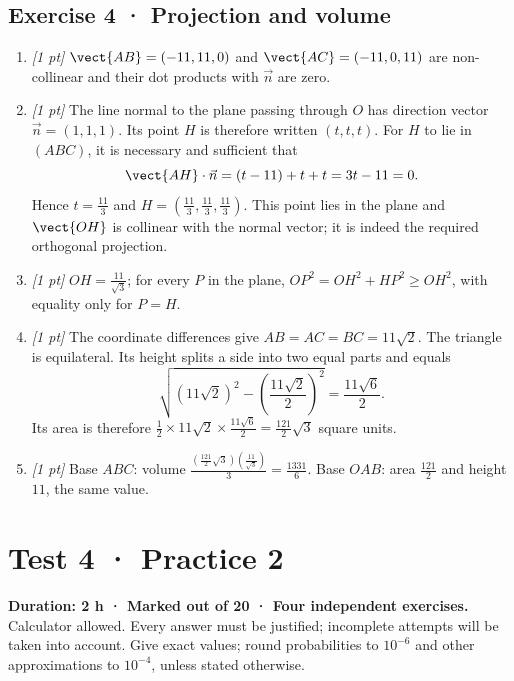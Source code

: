 \subsection*{Exercise 4 · Projection and volume}\begin{enumerate}

\item \textit{[1 pt]} $\vect{AB}=(-11,11,0)$ and $\vect{AC}=(-11,0,11)$ are non-collinear and their dot products with $\vec n$ are zero.

\item \textit{[1 pt]} The line normal to the plane passing through $O$ has direction vector $\vec n=(1,1,1)$. Its point $H$ is therefore written $(t,t,t)$. For $H$ to lie in $(ABC)$, it is necessary and sufficient that
\[\vect{AH}\cdot\vec n=(t-11)+t+t=3t-11=0.\]
Hence $t=\frac{11}{3}$ and $H=(\frac{11}{3},\frac{11}{3},\frac{11}{3})$. This point lies in the plane and $\vect{OH}$ is collinear with the normal vector; it is indeed the required orthogonal projection.

\item \textit{[1 pt]} $OH=\frac{11}{\sqrt{3}}$; for every $P$ in the plane, $OP^2=OH^2+HP^2\ge OH^2$, with equality only for $P=H$.

\item \textit{[1 pt]} The coordinate differences give $AB=AC=BC=11\sqrt2$. The triangle is equilateral. Its height splits a side into two equal parts and equals
\[\sqrt{(11\sqrt2)^2-(\frac{11\sqrt{2}}{2})^2}=\frac{11\sqrt6}{2}.\]
Its area is therefore $\frac12\times 11\sqrt2\times\frac{11\sqrt6}{2}=\frac{121}{2}\sqrt3$ square units.

\item \textit{[1 pt]} Base $ABC$: volume $\frac{(\frac{121}{2}\sqrt3)(\frac{11}{\sqrt{3}})}{3}=\frac{1331}{6}$. Base $OAB$: area $\frac{121}{2}$ and height $11$, the same value.

\end{enumerate}

\fi

\mxnewpage{}\label{sujet:6-2}

\section*{Test 4 · Practice 2}


\textbf{Duration: 2 h · Marked out of 20 · Four independent exercises.}\\Calculator allowed. Every answer must be justified; incomplete attempts will be taken into account. Give exact values; round probabilities to $10^{-6}$ and other approximations to $10^{-4}$, unless stated otherwise.

